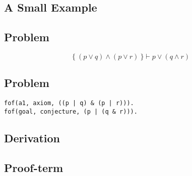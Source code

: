 \documentclass[../main.tex]{subfiles}
\begin{document}
\begin{subappendices}

\renewcommand{\thesection}{\Alph{section}}%

\section{A Small Example}
\label{appendix}

\subsection{\CPL Problem}

\begin{equation*}
\{\ (p ∨ q) ∧ (p ∨ r)\ \} \vdash p ∨ (q ∧ r)
\end{equation*}

\subsection{\TPTP Problem}

\begin{verbatim}
fof(a1, axiom, ((p | q) & (p | r))).
fof(goal, conjecture, (p | (q & r))).
\end{verbatim}

\subsection{\Metis \TSTP Derivation}


\subsection{\Agda Proof-term}

\end{subappendices}
\end{document}

